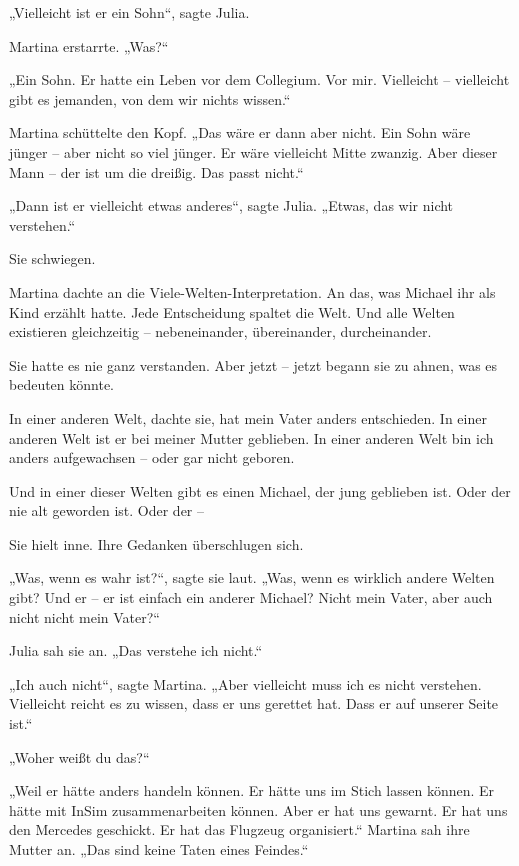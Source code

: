 \documentclass[
]{article}
\begin{document}
„Vielleicht ist er ein Sohn``, sagte Julia.

Martina erstarrte. „Was?{\kern0pt}``

„Ein Sohn. Er hatte ein Leben vor dem Collegium. Vor mir. Vielleicht -- vielleicht gibt es jemanden, von dem wir nichts wissen.``

Martina schüttelte den Kopf. „Das wäre er dann aber nicht. Ein Sohn wäre jünger -- aber nicht so viel jünger. Er wäre vielleicht Mitte zwanzig. Aber dieser Mann -- der ist um die dreißig. Das passt nicht.``

„Dann ist er vielleicht etwas anderes``, sagte Julia. „Etwas, das wir nicht verstehen.``

Sie schwiegen.

Martina dachte an die Viele-Welten-Interpretation. An das, was Michael ihr als Kind erzählt hatte. Jede Entscheidung spaltet die Welt. Und alle Welten existieren gleichzeitig -- nebeneinander, übereinander, durcheinander.

Sie hatte es nie ganz verstanden. Aber jetzt -- jetzt begann sie zu ahnen, was es bedeuten könnte.

In einer anderen Welt, dachte sie, hat mein Vater anders entschieden. In einer anderen Welt ist er bei meiner Mutter geblieben. In einer anderen Welt bin ich anders aufgewachsen -- oder gar nicht geboren.

Und in einer dieser Welten gibt es einen Michael, der jung geblieben ist. Oder der nie alt geworden ist. Oder der --

Sie hielt inne. Ihre Gedanken überschlugen sich.

„Was, wenn es wahr ist?{\kern0pt}``, sagte sie laut. „Was, wenn es wirklich andere Welten gibt? Und er -- er ist einfach ein anderer Michael? Nicht mein Vater, aber auch nicht nicht mein Vater?{\kern0pt}``

Julia sah sie an. „Das verstehe ich nicht.``

„Ich auch nicht``, sagte Martina. „Aber vielleicht muss ich es nicht verstehen. Vielleicht reicht es zu wissen, dass er uns gerettet hat. Dass er auf unserer Seite ist.``

„Woher weißt du das?{\kern0pt}``

„Weil er hätte anders handeln können. Er hätte uns im Stich lassen können. Er hätte mit InSim zusammenarbeiten können. Aber er hat uns gewarnt. Er hat uns den Mercedes geschickt. Er hat das Flugzeug organisiert.`` Martina sah ihre Mutter an. „Das sind keine Taten eines Feindes.``
\end{document}
